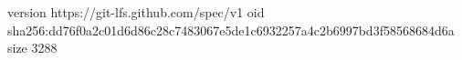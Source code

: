 version https://git-lfs.github.com/spec/v1
oid sha256:dd76f0a2c01d6d86c28c7483067e5de1c6932257a4c2b6997bd3f58568684d6a
size 3288
